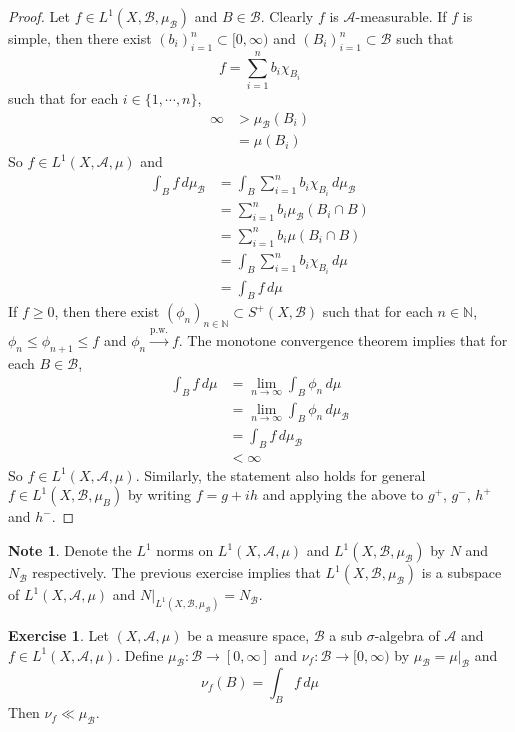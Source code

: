 \documentclass{book}
\theoremstyle{definition}
\newtheorem{note}[definition]{Note}
\newtheorem{ex}[definition]{Exercise}
\newcommand{\sig}{\sigma}
\newcommand{\N}{\mathbb{N}}
\newcommand{\MA}{\mathcal{A}}
\newcommand{\MB}{\mathcal{B}}
\DeclareMathOperator*{\0}{\mbf{0}}
\DeclareMathOperator*{\1}{\mbf{1}}
\newcommand{\limn}{\lim \limits_{n \rightarrow \infty}}
\newcommand{\convt}[1]{\xrightarrow{\text{#1}}}
\newcommand{\Rg}{[0,\infty)}
\newcommand{\dmu}{\, d \mu}
\begin{document}
	\begin{proof}
		Let $f \in L^1(X, \MB, \mu_{\MB})$ and $B \in \MB$. Clearly $f$ is $\MA$-measurable. If $f$ is simple, then there exist $(b_i)_{i=1}^n \subset \Rg$ and $(B_i)_{i=1}^n \subset \MB$ such that $$f = \sum_{i=1}^n b_i \chi_{B_i}$$ such that for each $i \in \{1, \cdots, n\}$, 
		\begin{align*}
			\infty 
			&> \mu_{\MB}(B_i) \\
			&= \mu(B_i)
		\end{align*}
		So $f \in L^1(X, \MA, \mu)$ and 
		\begin{align*}
			\int_B f \dmu_{\MB} 
			&= \int_B \sum_{i=1}^n b_i \chi_{B_i} \dmu_{\MB} \\
			&= \sum_{i=1}^n b_i \mu_{\MB}(B_i \cap B)\\
			&= \sum_{i=1}^n b_i \mu(B_i \cap B)\\
			&= \int_B \sum_{i=1}^n b_i\chi_{B_i} \dmu \\
			&= \int_B f \dmu
		\end{align*}
		If $f \geq 0$, then there exist $(\phi_n)_{n \in \N} \subset S^+(X, \MB)$ such that for each $n \in \N$, $\phi_n \leq \phi_{n+1} \leq f$ and $\phi_n \convt{p.w.} f$. The monotone convergence theorem implies that for each $B \in \MB$,
		\begin{align*}
			\int_B f \dmu
			&= \limn \int_B \phi_n \dmu \\
			&= \limn \int_B \phi_n \dmu_{\MB} \\
			& = \int_B f \dmu_{\MB} \\
			& < \infty
		\end{align*}
		So $f \in L^1(X, \MA, \mu)$.
		Similarly, the statement also holds for general $f \in L^1(X, \MB, \mu_B)$ by writing $f = g+ih$ and applying the above to $g^+$, $g^-$, $h^+$ and $h^-$.
	\end{proof}
	
	\begin{note}
		Denote the $L^1$ norms on $L^1(X, \MA, \mu)$ and $L^1(X, \MB, \mu_{\MB})$ by $N$ and $N_{\MB}$ respectively. The previous exercise implies that $L^1(X, \MB, \mu_{\MB})$ is a subspace of $L^1(X, \MA, \mu)$ and $N|_{L^1(X, \MB, \mu_{\MB})} = N_{\MB}$.
	\end{note}
	
	\begin{ex}
		Let $(X, \MA, \mu)$ be a measure space, $\MB$ a sub $\sig$-algebra of $\MA$ and $f \in L^1(X, \MA, \mu)$. Define $\mu_{\MB}: \MB \rightarrow [0, \infty] $ and $\nu_f: \MB \rightarrow [0,\infty)$ by $\mu_{\MB} = \mu|_{\MB}$ and 
		$$\nu_f(B) = \int_B f \dmu $$ Then $\nu_f \ll \mu_{\MB}$. 
	\end{ex}	
	
\end{document}
